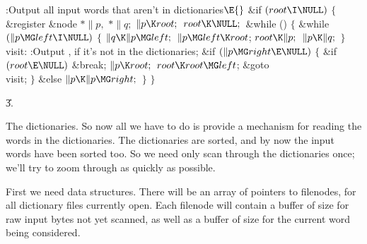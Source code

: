 \Y\B\4:Output all input words that aren't in dictionaries\X${}\E{}$\6
\&{if} ${}(\\{root}\I\NULL){}$\5
${}\{{}$\5
\1\&{register} \&{node} ${}{*}\|p,{}$ ${}{*}\|q;{}$\7
${}\|p\K\\{root};{}$\6
${}\\{root}\K\NULL;{}$\6
\&{while} ()\5
${}\{{}$\1\6
\&{while} ${}(\|p\MG\\{left}\I\NULL){}$\5
${}\{{}$\1\6
${}\|q\K\|p\MG\\{left};{}$\6
${}\|p\MG\\{left}\K\\{root}{}$;\6
${}\\{root}\K\|p;{}$\6
${}\|p\K\|q;{}$\6
\4${}\}{}$\2\6
\4\\{visit}:\5
:Output , if it's not in the dictionaries\X;\6
\&{if} ${}(\|p\MG\\{right}\E\NULL){}$\5
${}\{{}$\1\6
\&{if} ${}(\\{root}\E\NULL){}$\1\5
\&{break};\2\6
${}\|p\K\\{root};{}$\6
${}\\{root}\K\\{root}\MG\\{left}{}$;\6
\&{goto} \\{visit};\6
\4${}\}{}$\2\6
\&{else}\1\5
${}\|p\K\|p\MG\\{right};{}$\2\6
\4${}\}{}$\2\6
\4${}\}{}$\2\par
\U3.\fi

The dictionaries. So now all we have to do is provide a mechanism
for reading the words in the dictionaries. The dictionaries are sorted,
and by now the input words have been sorted too.
So we need only scan through the
dictionaries once; we'll try to zoom through as quickly as possible.

First we need data structures. There will be an array of pointers to filenodes,
for all dictionary files currently open. Each filenode will contain
a buffer of size  for raw input bytes not yet scanned,
as well as a buffer of size  for the current
word
being considered.

